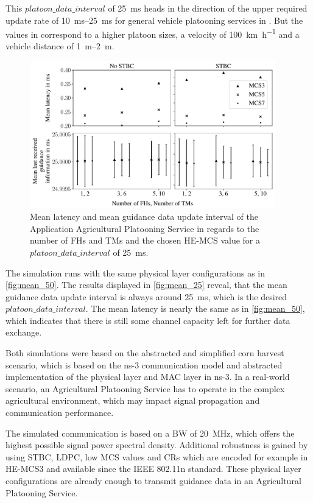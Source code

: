 This $platoon\_data\_interval$ of \SI{25}{\milli\second} heads in the direction of the upper required update rate of \SIrange{10}{25}{\milli\second} for general
vehicle platooning services in \cite{TR-22.886}.
But the values in \cite{TR-22.886} correspond to a higher platoon sizes, a velocity of \SI{100}{\kilo\meter\per\hour} and a
vehicle distance of \SIrange{1}{2}{\metre}.


\begin{figure}[]%
   \centering
   \includegraphics[width=0.95\textwidth]{figures/latency_lastUpdate25ms}
   \caption{Mean latency and mean guidance data update interval of the Application Agricultural Platooning Service in regards to the number of \ac{FH}s and \ac{TM}s and
   the chosen \ac{HE}-\ac{MCS} value for a $platoon\_data\_interval$ of \SI{25}{\milli\second}.}
   \label{fig:mean_25}%
\end{figure}

The simulation runs with the same physical layer configurations as in \autoref{fig:mean_50}.
The results displayed in \autoref{fig:mean_25} reveal, that the mean guidance data update interval is always around \SI{25}{\milli\second},
which is the desired $platoon\_data\_interval$.
The mean latency is nearly the same as in \autoref{fig:mean_50}, which indicates that there is still some channel capacity left for
further data exchange.

Both simulations were based on the abstracted and simplified corn harvest scenario, which is based on the ns-3 communication model and
abstracted implementation of the physical layer and MAC layer in ns-3.
In a real-world scenario, an Agricultural Platooning Service has to operate in the complex agricultural environment, which
may impact signal propagation and communication performance.

The simulated communication is based on a \ac{BW} of \SI{20}{\mega\hertz}, which offers the highest possible signal power spectral density.
Additional robustness is gained by using \ac{STBC}, \ac{LDPC}, low \ac{MCS} values and \ac{CR}s which are encoded for example in
\ac{HE}-\ac{MCS}3 and available since the IEEE 802.11n standard.
These physical layer configurations are already enough to transmit guidance data in an Agricultural Platooning Service.

